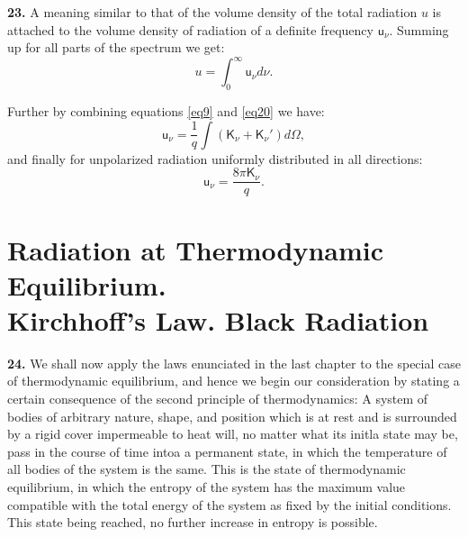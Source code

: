 \documentclass[12pt,oneside]{book}
\begin{document}
\textbf{23.} A meaning similar to that of the volume density of the total radiation $u$ is attached to the volume density of radiation of a definite frequency $\mathsf{u}_\nu$. Summing up for all parts of the spectrum we get:
\begin{equation}
    u=\int_0^\infty\mathsf{u}_\nu d\nu.
    \label{eq22}
\end{equation} \par

Further by combining equations \eqref{eq9} and \eqref{eq20} we have:
\begin{equation}
    \mathsf{u}_\nu=\frac{1}{q}\int(\mathsf{K}_\nu+\mathsf{K}_\nu')d\Omega,
    \label{eq23}
\end{equation}
and finally for unpolarized radiation uniformly distributed in all directions:
\begin{equation}
    \mathsf{u}_\nu=\frac{8\pi\mathsf{K}_\nu}{q}.
    \label{eq24}
\end{equation} \par

\chapter[Radiation at Thermodynamic Equilibrium]{Radiation at Thermodynamic Equilibrium.\\ Kirchhoff's Law. Black Radiation}

\textbf{24.} We shall now apply the laws enunciated in the last chapter to the special case of thermodynamic equilibrium, and hence we begin our consideration by stating a certain consequence of the second principle of thermodynamics: A system of bodies of arbitrary nature, shape, and position which is at rest and is surrounded by a rigid cover impermeable to heat will, no matter what its initla state may be, pass in the course of time intoa a permanent state, in which the temperature of all bodies of the system is the same. This is the state of thermodynamic equilibrium, in which the entropy of the system has the maximum value compatible with the total energy of the system as fixed by the initial conditions. This state being reached, no further increase in entropy is possible. \par
\end{document}
